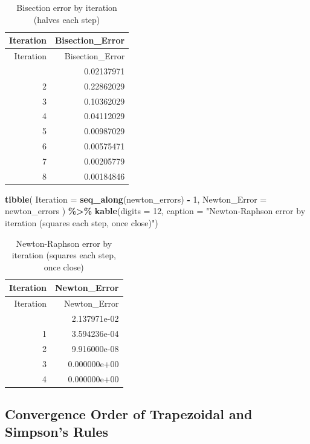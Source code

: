 \documentclass[
]{article}
\newenvironment{Shaded}{\begin{snugshade}}{\end{snugshade}}
\newcommand{\AttributeTok}[1]{\textcolor[rgb]{0.13,0.29,0.53}{#1}}
\newcommand{\DecValTok}[1]{\textcolor[rgb]{0.00,0.00,0.81}{#1}}
\newcommand{\FunctionTok}[1]{\textcolor[rgb]{0.13,0.29,0.53}{\textbf{#1}}}
\newcommand{\NormalTok}[1]{#1}
\newcommand{\SpecialCharTok}[1]{\textcolor[rgb]{0.81,0.36,0.00}{\textbf{#1}}}
\newcommand{\StringTok}[1]{\textcolor[rgb]{0.31,0.60,0.02}{#1}}
\begin{document}
\begin{longtable}[]{@{}rr@{}}
\caption{Bisection error by iteration (halves each step)}\tabularnewline
\toprule\noalign{}
Iteration & Bisection\_Error \\
\midrule\noalign{}
\endfirsthead
\toprule\noalign{}
Iteration & Bisection\_Error \\
\midrule\noalign{}
\endhead
\bottomrule\noalign{}
\endlastfoot
1 & 0.02137971 \\
2 & 0.22862029 \\
3 & 0.10362029 \\
4 & 0.04112029 \\
5 & 0.00987029 \\
6 & 0.00575471 \\
7 & 0.00205779 \\
8 & 0.00184846 \\
\end{longtable}

\begin{Shaded}
\begin{Highlighting}[]
\FunctionTok{tibble}\NormalTok{(}
  \AttributeTok{Iteration =} \FunctionTok{seq\_along}\NormalTok{(newton\_errors) }\SpecialCharTok{{-}} \DecValTok{1}\NormalTok{,}
  \AttributeTok{Newton\_Error =}\NormalTok{ newton\_errors}
\NormalTok{) }\SpecialCharTok{\%\textgreater{}\%}
  \FunctionTok{kable}\NormalTok{(}\AttributeTok{digits =} \DecValTok{12}\NormalTok{, }\AttributeTok{caption =} \StringTok{"Newton{-}Raphson error by iteration (squares each step, once close)"}\NormalTok{)}
\end{Highlighting}
\end{Shaded}

\begin{longtable}[]{@{}rr@{}}
\caption{Newton-Raphson error by iteration (squares each step, once
close)}\tabularnewline
\toprule\noalign{}
Iteration & Newton\_Error \\
\midrule\noalign{}
\endfirsthead
\toprule\noalign{}
Iteration & Newton\_Error \\
\midrule\noalign{}
\endhead
\bottomrule\noalign{}
\endlastfoot
0 & 2.137971e-02 \\
1 & 3.594236e-04 \\
2 & 9.916000e-08 \\
3 & 0.000000e+00 \\
4 & 0.000000e+00 \\
\end{longtable}

\subsection{Convergence Order of Trapezoidal and Simpson's
Rules}\label{convergence-order-of-trapezoidal-and-simpsons-rules}
\end{document}
